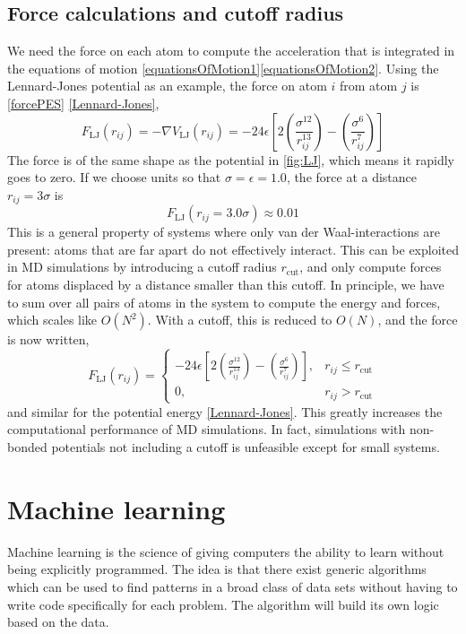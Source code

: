 \documentclass[twoside,english]{uiofysmaster}
\begin{document}
\section{Force calculations and cutoff radius} \label{sec:forceCutoff}
We need the force on each atom to compute the acceleration that is integrated in the equations of motion
\eqref{equationsOfMotion1}\eqref{equationsOfMotion2}. 
Using the Lennard-Jones potential as an example, 
the force on atom $i$ from atom $j$ is \eqref{forcePES} \eqref{Lennard-Jones},
\begin{equation}
 F_{\mathrm{LJ}}(r_{ij}) = -\nabla V_{\mathrm{LJ}}(r_{ij}) = 
 -24\epsilon\left[2\left(\frac{\sigma^{12}}{r_{ij}^{13}}\right) - \left(\frac{\sigma^6}{r_{ij}^7}\right)\right] 
\end{equation}
The force is of the same shape 
as the potential in \autoref{fig:LJ}, which means it rapidly goes to zero. If we choose units so that
$\sigma=\epsilon=1.0$, the force at a distance $r_{ij} = 3\sigma$ is
\begin{equation}
 F_{\mathrm{LJ}}(r_{ij} = 3.0\sigma) \approx 0.01
\end{equation}
This is a general property of systems where only van der Waal-interactions are present: atoms that 
are far apart do not effectively interact. This can be exploited in MD simulations by introducing 
a cutoff radius $r_{\mathrm{cut}}$, and only compute forces for atoms displaced by a distance smaller than this cutoff. 
In principle, we have to sum over all pairs of atoms in the system to compute the energy and forces, which 
scales like $O(N^2)$. With a cutoff, this is reduced to $O(N)$, and the force is now written,
\begin{equation}
 F_{\mathrm{LJ}}(r_{ij}) = 
 \begin{cases}
  -24\epsilon\left[2\left(\frac{\sigma^{12}}{r_{ij}^{13}}\right) - \left(\frac{\sigma^6}{r_{ij}^7}\right)\right] ,
  & r_{ij} \leq r_{\mathrm{cut}} \\
  0, & r_{ij} > r_{\mathrm{cut}} 
 \end{cases}
 \label{forceCutoff}
\end{equation}
and similar for the potential energy \eqref{Lennard-Jones}. 
This greatly increases the computational performance of MD simulations. In fact, simulations with non-bonded potentials
not including a cutoff is unfeasible except for small systems. 



\chapter{Machine learning} \label{sec:machineLearning}
Machine learning is the science of giving computers the ability to learn without being explicitly programmed. 
The idea is that there exist generic algorithms which can be used to find patterns in a broad class of data sets without 
having to write code specifically for each problem. The algorithm will build its own logic based on the data.  
\end{document}
